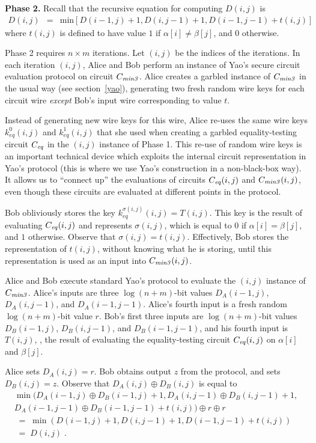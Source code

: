 \vspace{1ex}
\noindent
\textbf{Phase 2.}
Recall that the recursive equation for computing $D(i,j)$ is 
\begin{eqnarray*}
D(i,j) & = & \mbox{min} [ D(i-1,j)+1, D(i,j-1)+1, D(i-1,j-1)+t(i,j) ]
\end{eqnarray*}
where $t(i,j)$ is defined to have value $1$ if $\alpha[i] \neq \beta[j]$,
and $0$ otherwise.

Phase 2 requires $n \times m$ iterations.  Let $(i,j)$ be the indices
of the iterations.  In each iteration $(i,j)$, Alice and Bob perform an
instance of Yao's secure circuit evaluation protocol on circuit $C_{\mathit{min3}}$.
Alice creates a garbled instance of $C_{\mathit{min3}}$ in the usual way (see
section~\ref{yao}), generating two fresh random wire keys for each
circuit wire \emph{except} Bob's input wire corresponding to value $t$.

Instead of generating new wire keys for this wire, Alice re-uses the
same wire keys $k^0_{\mathit{eq}}(i,j)$ and $k^1_{\mathit{eq}}(i,j)$
that she used when creating a garbled equality-testing circuit $C_{\mathit{eq}}$
in the $(i,j)$ instance of Phase 1.  This re-use of random wire keys
is an important technical device which exploits the internal circuit
representation in Yao's protocol (this is where we use Yao's construction
in a non-black-box way).  It allows us to ``connect up'' the evaluations
of circuits $C_{\mathit{eq}}(i,j)$ and $C_{\mathit{min3}}(i,j)$, even though these circuits are
evaluated at different points in the protocol.

Bob obliviously stores the key $k^{\sigma(i,j)}_{\mathit{eq}}(i,j) =
T(i,j)$.  This key is the result of evaluating $C_{\mathit{eq}}(i,j)$ and represents
$\sigma(i,j)$, which is equal to $0$ if $\alpha[i]=\beta[j]$, and $1$
otherwise.  Observe that $\sigma(i,j)=t(i,j)$.  Effectively, Bob stores
the representation of $t(i,j)$, without knowing what he is storing,
until this representation is used as an input into $C_{\mathit{min3}}(i,j)$.

Alice and Bob execute standard Yao's protocol to evaluate the $(i,j)$
instance of $C_{\mathit{min3}}$.  Alice's inputs are three $\log(n+m)$-bit values
$D_A(i-1,j)$, $D_A(i,j-1)$, and $D_A(i-1,j-1)$.  Alice's fourth input is
a fresh random $\log(n+m)$-bit value $r$. Bob's first three inputs are
$\log(n+m)$-bit values $D_B(i-1,j)$, $D_B(i,j-1)$, and $D_B(i-1,j-1)$,
and his fourth input is $T(i,j)$, \ie, the result of evaluating the
equality-testing circuit $C_{\mathit{eq}}(i,j)$ on $\alpha[i]$ and $\beta[j]$.

Alice sets $D_A(i,j)=r$.  Bob obtains output $z$ from the protocol,
and sets $D_B(i,j)=z$.  Observe that $D_A (i,j) \oplus D_B (i,j)$ is equal to
\[
\begin{array}{l}
\min( D_A(i-1,j) \oplus D_B(i-1,j) + 1, D_A(i,j-1) \oplus D_B(i,j-1) +1 , \\ 
       D_A(i-1,j-1) \oplus D_B(i-1,j-1) + t(i,j) ) \oplus r \oplus r \\ 
\; = \; \min( D(i-1,j)+1, D(i,j-1)+1,D(i-1,j-1)+t(i,j)) \\
\; = \; D(i,j) \;.
\end{array}
\]

